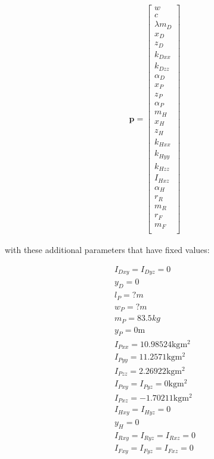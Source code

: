 \documentclass{bmd2019a}
\begin{document}
\begin{align}
  \mathbf{p} =
  \begin{bmatrix}
    w \\
    c \\
    \lambda
    m_D \\
    x_D \\
    z_D \\
    k_{Dxx} \\
    k_{Dzz} \\
    \alpha_D \\
    x_P \\
    z_P \\
    \alpha_P \\
    m_H \\
    x_H \\
    z_H \\
    k_{Hxx} \\
    k_{Hyy} \\
    k_{Hzz} \\
    I_{Hxz} \\
    \alpha_H \\
    r_R \\
    m_R \\
    r_F \\
    m_F \\
  \end{bmatrix}
\end{align}

with these additional parameters that have fixed values:

\begin{align}
  I_{Dxy} = I_{Dyz} = 0 \\
  y_D = 0 \\
  l_P = ? \si{m}\\
  w_P = ? \si{m} \\
  m_P = 83.5 \si{kg} \\
  y_P = 0 \si{\meter} \\
  I_{Pxx} = 10.98524 \si{\kg\meter^2} \\
  I_{Pyy} = 11.2571 \si{\kg\meter^2}\\
  I_{Pzz} = 2.26922 \si{\kg\meter^2}\\
  I_{Pxy} = I_{Pyz} = 0 \si{\kg\meter^2}\\
  I_{Pxz} = -1.70211 \si{\kg\meter^2}\\
  I_{Hxy} = I_{Hyz} = 0 \\
  y_H = 0 \\
  I_{Rxy} = I_{Ryz} = I_{Rxz} = 0 \\
  I_{Fxy} = I_{Fyz} = I_{Fxz} = 0 \\
\end{align}
\end{document}
